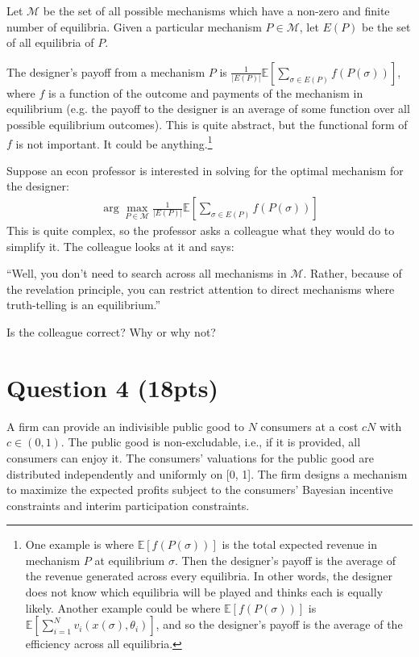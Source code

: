 \documentclass[10pt,a4paper]{article}
\begin{document}
  Let $\mathcal{M}$ be the set of all possible mechanisms which have a non-zero and finite number of equilibria. Given a particular mechanism $P \in \mathcal{M}$, let $E(P)$ be the set of all equilibria of $P$.

  The designer's payoff from a mechanism $P$ is $\frac{1}{|E(P)|}\mathbb{E}\left[\sum_{\sigma\in E(P)}f(P(\sigma))\right]$, where $f$ is a function of the outcome and payments of the mechanism in equilibrium (e.g. the payoff to the designer is an average of some function over all possible equilibrium outcomes). This is quite abstract, but the functional form of $f$ is not important. It could be anything.\footnote{One example is where $\mathbb{E}[f(P(\sigma))]$ is the total expected revenue in mechanism $P$ at equilibrium $\sigma$. Then the designer's payoff is the average of the revenue generated across every equilibria. In other words, the designer does not know which equilibria will be played and thinks each is equally likely. Another example could be where $\mathbb{E}[f(P(\sigma))]$ is $\mathbb{E}\left[\sum_{i=1}^N v_i(x(\sigma), \theta_i)\right]$, and so the designer's payoff is the average of the efficiency across all equilibria.}

  Suppose an econ professor is interested in solving for the optimal mechanism for the designer:
  \begin{align*}
      \arg\max_{P \in \mathcal{M}} \frac{1}{|E(P)|}\mathbb{E}\left[\sum_{\sigma\in E(P)}f(P(\sigma))\right]
  \end{align*}
  This is quite complex, so the professor asks a colleague what they would do to simplify it. The colleague looks at it and says:

  ``Well, you don't need to search across all mechanisms in $\mathcal{M}$. Rather, because of the revelation principle, you can restrict attention to direct mechanisms where truth-telling is an equilibrium.''

  Is the colleague correct? Why or why not?

\section*{Question 4 (18pts)}
  A firm can provide an indivisible public good to $N$ consumers at a cost $cN$ with $c \in (0, 1)$. The public good is non-excludable, i.e., if it is provided, all consumers can enjoy it. The consumers' valuations for the public good are distributed independently and uniformly on [0, 1]. The firm designs a mechanism to maximize the expected profits subject to the consumers' Bayesian incentive constraints and interim participation constraints.
\end{document}
